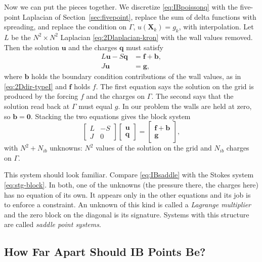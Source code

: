 Now we can put the pieces together. We discretize \eqref{eq:IBpoissonq}
with the five-point Laplacian of Section~\ref{sec:fivepoint}, replace the
sum of delta functions with spreading, and replace the condition on
$\Gamma$, $u(\mathbf{X}_k) = g_k$, with interpolation. Let $L$ be the
$N^2 \times N^2$ Laplacian \eqref{eq:2Dlaplacian-kron} with the wall values
removed. Then the solution $\mathbf{u}$ and the charges $\mathbf{q}$ must
satisfy
\begin{align}
  L\mathbf{u} - S\mathbf{q} &= \mathbf{f} + \mathbf{b},
  \label{eq:IBsaddleTop}\\
  J\mathbf{u} &= \mathbf{g},
  \label{eq:IBsaddleBottom}
\end{align}
where $\mathbf{b}$ holds the boundary condition contributions of the wall values, as in
\eqref{eq:2Ddir-typeI} and $\mathbf{f}$ holds $f$. The first equation says the solution on the grid
is produced by the forcing $f$ and the charges on $\Gamma$. The second
says that the solution read back at $\Gamma$ must equal $g$. In our
problem the walls are held at zero, so $\mathbf{b} = \mathbf{0}$. Stacking the
two equations gives the block system
\begin{equation}
  \begin{bmatrix}
    L & -S \\
    J & 0
  \end{bmatrix}
  \begin{bmatrix}
    \mathbf{u} \\ \mathbf{q}
  \end{bmatrix}
  =
  \begin{bmatrix}
    \mathbf{f} + \mathbf{b} \\ \mathbf{g}
  \end{bmatrix},
  \label{eq:IBsaddle}
\end{equation}
with $N^2 + N_{ib}$ unknowns: $N^2$ values of the solution on the grid and
$N_{ib}$ charges on $\Gamma$.

This system should look familiar. Compare \eqref{eq:IBsaddle} with the
Stokes system \eqref{eq:stg-block}. In both, one of the unknowns (the
pressure there, the charges here) has no equation of its own. It appears
only in the other equations and its job is to enforce a constraint. An unknown of this kind is called a \emph{Lagrange multiplier}
and the zero block on the diagonal is its signature. Systems with this
structure are called \emph{saddle point systems}.

\subsection{How Far Apart Should IB Points Be?}
\label{sec:IBclose}

